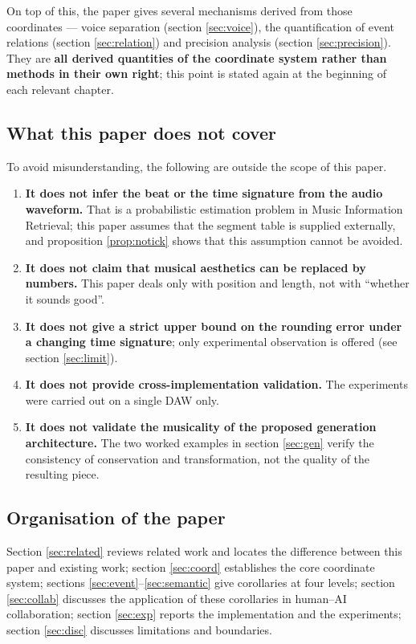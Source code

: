 \documentclass[11pt,a4paper]{article}
\begin{document}
On top of this, the paper gives several mechanisms derived from those coordinates ---
voice separation (section \ref{sec:voice}), the quantification of event relations
(section \ref{sec:relation}) and precision analysis (section \ref{sec:precision}).
They are \textbf{all derived quantities of the coordinate system rather than methods in
their own right}; this point is stated again at the beginning of each relevant chapter.

\subsection{What this paper does not cover}

To avoid misunderstanding, the following are outside the scope of this paper.

\begin{enumerate}[leftmargin=2.2em,itemsep=0.15em,topsep=0.2em]
  \item \textbf{It does not infer the beat or the time signature from the audio
        waveform.} That is a probabilistic estimation problem in Music Information
        Retrieval; this paper assumes that the segment table is supplied externally,
        and proposition \ref{prop:notick} shows that this assumption cannot be avoided.
  \item \textbf{It does not claim that musical aesthetics can be replaced by numbers.}
        This paper deals only with position and length, not with ``whether it sounds
        good''.
  \item \textbf{It does not give a strict upper bound on the rounding error under a
        changing time signature}; only experimental observation is offered
        (see section \ref{sec:limit}).
  \item \textbf{It does not provide cross-implementation validation.} The experiments
        were carried out on a single DAW only.
  \item \textbf{It does not validate the musicality of the proposed generation
        architecture.} The two worked examples in section \ref{sec:gen} verify the
        consistency of conservation and transformation, not the quality of the
        resulting piece.
\end{enumerate}

\subsection{Organisation of the paper}

Section \ref{sec:related} reviews related work and locates the difference between this
paper and existing work;
section \ref{sec:coord} establishes the core coordinate system;
sections \ref{sec:event}--\ref{sec:semantic} give corollaries at four levels;
section \ref{sec:collab} discusses the application of these corollaries in human--AI
collaboration;
section \ref{sec:exp} reports the implementation and the experiments;
section \ref{sec:disc} discusses limitations and boundaries.
\end{document}
